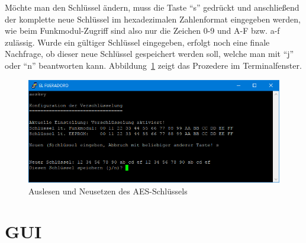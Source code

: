 \documentclass[paper=a4, parskip, numbers=noenddot, toc=listof, headsepline]{scrbook}
\begin{document}
				Möchte man den Schlüssel ändern, muss die Taste \enquote{s} gedrückt und anschließend der komplette neue Schlüssel im hexadezimalen Zahlenformat eingegeben werden, wie beim Funkmodul-Zugriff sind also nur die Zeichen 0-9 und A-F bzw. a-f zulässig. Wurde ein gültiger Schlüssel eingegeben, erfolgt noch eine finale Nachfrage, ob dieser neue Schlüssel gespeichert werden soll, welche man mit \enquote{j} oder \enquote{n} beantworten kann. Abbildung~\ref{fig:aeskey} zeigt das Prozedere im Terminalfenster.

				\begin{figure}[!h]
					\centering
					\includegraphics[width=.8\textwidth]{Bilder/aeskey}
					\caption{Auslesen und Neusetzen des AES-Schlüssels}
					\label{fig:aeskey}
				\end{figure}
				\clearpage

		\section{GUI}
\end{document}
